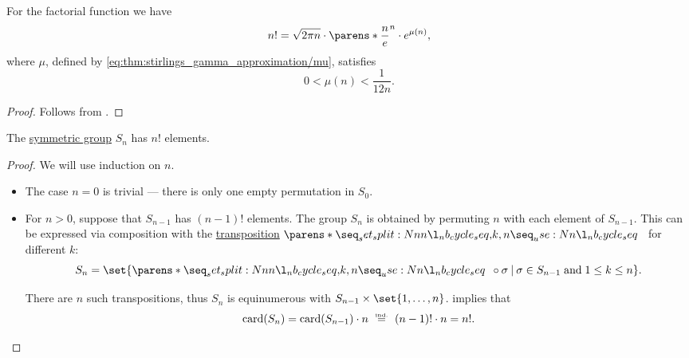 \begin{theorem}\label{thm:stirlings_factorial_approximation}
  For the factorial function we have
  \begin{equation*}
    n! = \sqrt{2 \pi n} \cdot \parens*{ \frac n e }^n \cdot e^{\mu(n)},
  \end{equation*}
  where \( \mu \), defined by \eqref{eq:thm:stirlings_gamma_approximation/mu}, satisfies
  \begin{equation*}
    0 < \mu(n) < \frac 1 {12n}.
  \end{equation*}
\end{theorem}
\begin{proof}
  Follows from .
\end{proof}

\begin{proposition}\label{thm:symmetric_group_cardinality}
  The \hyperref[def:symmetric_group]{symmetric group} \( S_n \) has \( n! \) elements.
\end{proposition}
\begin{proof}
  We will use induction on \( n \).

  \begin{itemize}
    \item The case \( n = 0 \) is trivial --- there is only one empty permutation in \( S_0 \).

    \item For \( n > 0 \), suppose that \( S_{n - 1} \) has \( (n - 1)! \) elements. The group \( S_n \) is obtained by permuting \( n \) with each element of \( S_{n - 1} \). This can be expressed via composition with the \hyperref[def:transposition]{transposition} \( \cycle{ k, n } \) for different \( k \):
    \begin{equation*}
      S_n = \set{ \cycle{ k, n } \bincirc \sigma \given \sigma \in S_{n-1} \T{and} 1 \leq k \leq n }.
    \end{equation*}

    There are \( n \) such transpositions, thus \( S_n \) is equinumerous with \( S_{n-1} \times \set{ 1, \ldots, n } \).  implies that
    \begin{equation*}
      \card(S_n)
      =
      \card(S_{n-1}) \cdot n
      \reloset {\T{ind.}} =
      (n - 1)! \cdot n
      =
      n!.
    \end{equation*}
  \end{itemize}
\end{proof}

